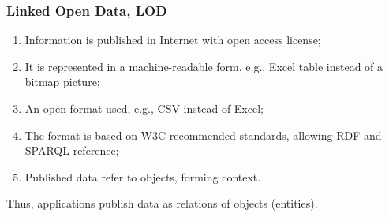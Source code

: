 \documentclass[10pt]{beamer}
\begin{document}
\begin{frame}
  \frametitle{Linked Open Data, LOD}
  \begin{enumerate}
  \item Information is published in Internet with open access license;
  \item It is represented in a machine-readable form, e.g., Excel table instead of a bitmap picture;
  \item An open format used, e.g., CSV instead of Excel;
  \item The format is based on W3C recommended standards, allowing RDF and SPARQL reference;
  \item Published data refer to objects, forming context.
  \end{enumerate}
  Thus, applications publish data as relations of objects (entities).
\end{frame}
\end{document}
